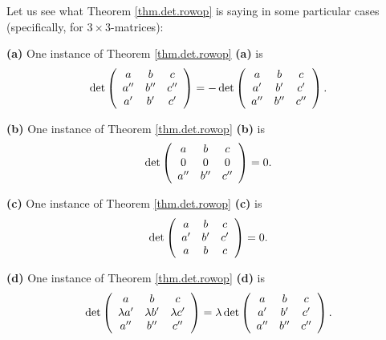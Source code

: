 \begin{example}
Let us see what Theorem \ref{thm.det.rowop} is saying in some particular cases
(specifically, for $3\times3$-matrices): \medskip

\textbf{(a)} One instance of Theorem \ref{thm.det.rowop} \textbf{(a)} is
\[
\det\left(
\begin{array}
[c]{ccc}%
a & b & c\\
a^{\prime\prime} & b^{\prime\prime} & c^{\prime\prime}\\
a^{\prime} & b^{\prime} & c^{\prime}%
\end{array}
\right)  =-\det\left(
\begin{array}
[c]{ccc}%
a & b & c\\
a^{\prime} & b^{\prime} & c^{\prime}\\
a^{\prime\prime} & b^{\prime\prime} & c^{\prime\prime}%
\end{array}
\right)  .
\]


\textbf{(b)} One instance of Theorem \ref{thm.det.rowop} \textbf{(b)} is
\[
\det\left(
\begin{array}
[c]{ccc}%
a & b & c\\
0 & 0 & 0\\
a^{\prime\prime} & b^{\prime\prime} & c^{\prime\prime}%
\end{array}
\right)  =0.
\]


\textbf{(c)} One instance of Theorem \ref{thm.det.rowop} \textbf{(c)} is
\[
\det\left(
\begin{array}
[c]{ccc}%
a & b & c\\
a^{\prime} & b^{\prime} & c^{\prime}\\
a & b & c
\end{array}
\right)  =0.
\]


\textbf{(d)} One instance of Theorem \ref{thm.det.rowop} \textbf{(d)} is
\[
\det\left(
\begin{array}
[c]{ccc}%
a & b & c\\
\lambda a^{\prime} & \lambda b^{\prime} & \lambda c^{\prime}\\
a^{\prime\prime} & b^{\prime\prime} & c^{\prime\prime}%
\end{array}
\right)  =\lambda\det\left(
\begin{array}
[c]{ccc}%
a & b & c\\
a^{\prime} & b^{\prime} & c^{\prime}\\
a^{\prime\prime} & b^{\prime\prime} & c^{\prime\prime}%
\end{array}
\right)  .
\]



\end{example}
